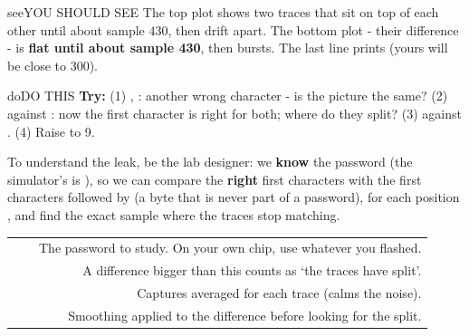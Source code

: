 \documentclass[11pt,letterpaper]{article}
\begin{document}
\begin{guidecallout}{see}{YOU SHOULD SEE}
The top plot shows two traces that sit on top of each other until about sample 430, then drift apart. The bottom plot
- their difference - is \textbf{flat until about sample 430}, then bursts. The last line prints  (yours will be close to 300).
\end{guidecallout}

\begin{guidecallout}{do}{DO THIS}
\textbf{Try:} (1) , : another wrong character - is the picture the same? (2)
 against : now the first character is
right for both; where do they split? (3)  against
. (4) Raise  to 9.
\end{guidecallout}

\Needspace{252pt}


To understand the leak, be the lab designer: we \textbf{know} the password (the simulator's is ), so we
can compare the \textbf{right} first  characters with the first  characters followed by
 (a byte that is never part of a password), for each position , and find the exact
sample where the traces stop matching.

{\small{}
\begin{longtable}{|R{0.2391}|R{0.1522}|R{0.6087}|}
\hline
{} &  &  \\ \hline
\endhead
{} &  & The password to study. On your own chip, use whatever you flashed. \\ \hline
{} &  & A difference bigger than this counts as `the traces have split'. \\ \hline
{} &  & Captures averaged for each trace (calms the noise). \\ \hline
{} &  & Smoothing applied to the difference before looking for the split. \\ \hline
\end{longtable}}
\end{document}
